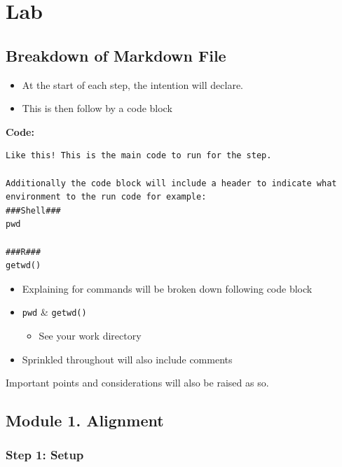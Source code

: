\documentclass[
]{book}
\providecommand{\tightlist}{%
  \setlength{\itemsep}{0pt}\setlength{\parskip}{0pt}}
\begin{document}
\section{Lab}\label{lab}

\subsection{Breakdown of Markdown File}\label{breakdown-of-markdown-file}

\begin{itemize}
\tightlist
\item
  At the start of each step, the intention will declare.
\item
  This is then follow by a code block
\end{itemize}

\textbf{Code:}

\begin{verbatim}
Like this! This is the main code to run for the step.

Additionally the code block will include a header to indicate what environment to the run code for example:
###Shell###
pwd

###R###
getwd()
\end{verbatim}

\begin{itemize}
\tightlist
\item
  Explaining for commands will be broken down following code block
\item
  \texttt{pwd} \& \texttt{getwd()}

  \begin{itemize}
  \tightlist
  \item
    See your work directory
  \end{itemize}
\item
  Sprinkled throughout will also include comments
\end{itemize}

Important points and considerations will also be raised as so.

\subsection{Module 1. Alignment}\label{module-1.-alignment}

\subsubsection{Step 1: Setup}\label{step-1-setup}
\end{document}

